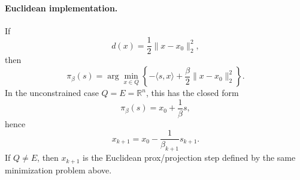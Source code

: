 \documentclass[12pt,a4paper]{article}
\begin{document}

\paragraph{Euclidean implementation.}
If
\begin{equation}
    d(x)=\frac12\|x-x_0\|_2^2,
\end{equation}
then
\begin{equation}
    \pi_\beta(s)
    =
    \arg\min_{x\in Q}\left\{-\langle s,x\rangle + \frac{\beta}{2}\|x-x_0\|_2^2\right\}.
\end{equation}
In the unconstrained case \(Q=E=\mathbb{R}^n\), this has the closed form
\begin{equation}
    \pi_\beta(s)=x_0+\frac{1}{\beta}s,
\end{equation}
hence
\begin{equation}
    x_{k+1}=x_0-\frac{1}{\beta_{k+1}}s_{k+1}.
\end{equation}
If \(Q\neq E\), then \(x_{k+1}\) is the Euclidean prox/projection step defined by the same minimization problem above.
\end{document}
